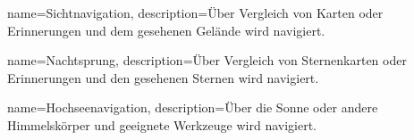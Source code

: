 {
    name=Sichtnavigation,
    description={Über Vergleich von Karten oder Erinnerungen und dem gesehenen Gelände wird navigiert.}
}

{
    name=Nachtsprung,
    description={Über Vergleich von Sternenkarten oder Erinnerungen und den gesehenen Sternen wird navigiert.}
}

{
    name=Hochseenavigation,
    description={Über die Sonne oder andere Himmelskörper und geeignete Werkzeuge wird navigiert.}
}